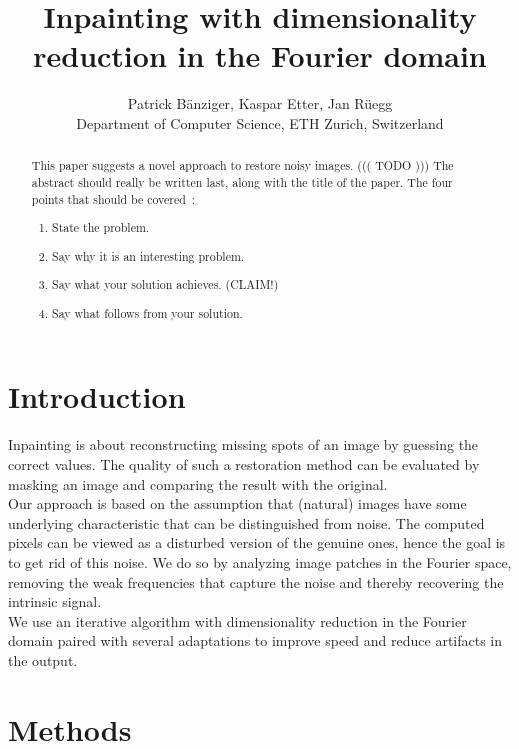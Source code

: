 \documentclass[10pt,conference,compsocconf]{IEEEtran}
\begin{document}
\title{Inpainting with dimensionality reduction in the Fourier domain}

\author{
  Patrick Bänziger, Kaspar Etter, Jan Rüegg\\
  Department of Computer Science, ETH Zurich, Switzerland
}

\maketitle

\begin{abstract}
  This paper suggests a novel approach to restore noisy images.
  ((( TODO )))
  The abstract should really be written last, along with the title of
the paper. The four points that should be covered~\cite{jones08}:
\begin{enumerate}
\item State the problem.
\item Say why it is an interesting problem.
\item Say what your solution achieves. (CLAIM!)
\item Say what follows from your solution.
\end{enumerate}
\end{abstract}

\section{Introduction}
Inpainting is about reconstructing missing spots of an image by guessing the correct values. The quality of such a restoration method can be evaluated by masking an image and comparing the result with the original.\\
Our approach is based on the assumption that (natural) images have some underlying characteristic that can be distinguished from noise. The computed pixels can be viewed as a disturbed version of the genuine ones, hence the goal is to get rid of this noise. We do so by analyzing image patches in the Fourier space, removing the weak frequencies that capture the noise and thereby recovering the intrinsic signal.\\
We use an iterative algorithm with dimensionality reduction in the Fourier domain paired with several adaptations to improve speed and reduce artifacts in the output.

\section{Methods}
\end{document}
